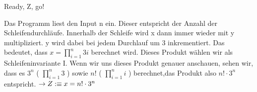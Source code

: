 \documentclass[
  english
]{tumteaching}
\begin{document}
\begin{assignment}[H, points=6]{Ready, Z, go!}
\begin{center}
  \end{center}

Das Programm liest den Input n ein. Dieser entspricht der Anzahl der Schleifendurchläufe. Innerhalb der Schleife wird x dann immer wieder mit y multipliziert. y wird dabei bei jedem Durchlauf um 3 inkrementiert. Das bedeutet, dass \(x = \prod \limits_{i=1}^{n} 3i\) berechnet wird. Dieses Produkt wählen wir als Schleifeninvariante I. Wenn wir uns dieses Produkt genauer anschauen, sehen wir, dass es \(3^n\) ( \(\prod \limits_{i=1}^{n} 3\) ) sowie \(n!\) ( \(\prod \limits_{i=1}^{n} i\) ) berechnet,das Produkt also \(n! \cdot 3^n\) entspricht.
\(\rightarrow Z :\equiv x = n! \cdot 3^n\)


\end{assignment}
\end{document}
